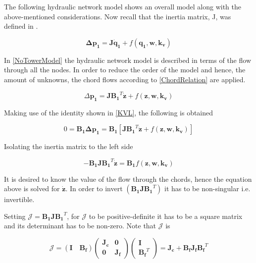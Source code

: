 The following hydraulic network model shows an overall model along with the above-mentioned considerations. 
Now recall that the inertia matrix, J, was defined in .

\begin{equation}
  \pmb{\Delta p_1} =  \pmb{J} \pmb{\dot{q}_1} + f(\pmb{q_1}, \pmb{w}, \pmb{k_v})
  \label{NoTowerModel}
\end{equation}

In \eqref{NoTowerModel} the hydraulic network model is described in terms of the 
flow through all the nodes. In order to reduce the order of the model and hence, 
the amount of unknowns, the chord flows according to \eqref{ChordRelation} are applied. 

\begin{equation}
  \Delta \pmb{p_1} =  \pmb{J} {\pmb{B_1}}^T \pmb{\dot{z}} + f(\pmb{z}, \pmb{w}, \pmb{k_v})
  \label{ChordsModel}
\end{equation}

Making use of the identity shown in \eqref{KVL}, the following is obtained

\begin{equation}
  0 = \pmb{B_1} \pmb{\Delta p_1} = \pmb{B_1} [ \pmb{J {B_1}}^T \pmb{\dot{z}} + f(\pmb{z}, \pmb{w}, \pmb{k_v})] 
 \end{equation}

Isolating the inertia matrix to the left side

\begin{equation}
 - \pmb{B_1} \pmb{J} \pmb{{B_1}}^T \pmb{\dot{z}}  = \pmb{B_1} f(\pmb{z}, \pmb{w}, \pmb{k_v})
 \label{isolateZ}
 \end{equation}

It is desired to know the value of the flow through the chords, hence the equation above is solved 
for $\pmb{\dot{z}}$. In order to invert $(\pmb{B_1 J} \pmb{{B_1}}^T)$ it has to be non-singular i.e. invertible. 

Setting $\pmb{\mathcal{J}} = \pmb{B_1 J} \pmb{{B_1}}^T $, for $\pmb{\mathcal{J}}$ to be positive-definite it has to be a square matrix and its 
determinant has to be non-zero. Note that $\pmb{\mathcal{J}}$ is

\begin{equation}
  \label{Jequation}
  \pmb{\mathcal{J}} = (\pmb{I \quad B_f}) 
  \begin{pmatrix}
    \pmb{J_c}    &    \pmb{0 }   \\
    \pmb{0}       &   \pmb{ J_f}
  \end{pmatrix}
  \begin{pmatrix}
    \pmb{I}    \\
    \pmb{{B_f}}^T
  \end{pmatrix}
  = \pmb{J_c} + \pmb{B_f J_f} \pmb{{B_f}}^T
\end{equation}

